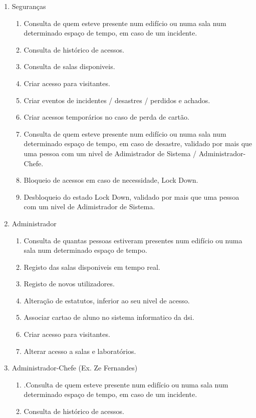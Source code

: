 \documentclass[a4paper]{report}
\begin{document}
\begin{enumerate}
\item Seguranças
	\begin{enumerate}
	\item Consulta de quem esteve presente num edifício ou numa sala num determinado espaço de tempo, em caso de um incidente.
    \item Consulta de histórico de acessos.
    \item Consulta de salas disponiveis.
    \item Criar acesso para visitantes.
    \item Criar eventos de incidentes / desastres / perdidos e achados.
    \item Criar acessos temporários no caso de perda de cartão.
    \item Consulta de quem esteve presente num edifício ou numa sala num determinado espaço de tempo, em caso de desastre, validado por mais que uma pessoa com um nivel de Adimistrador de Sistema / Administrador-Chefe.
    \item Bloqueio de acessos em caso de necessidade, Lock Down.
    \item Desbloqueio do estado Lock Down, validado por mais que uma pessoa com um nivel de Adimistrador de Sistema.
	\end{enumerate}
\item Administrador
	\begin{enumerate}
    \item Consulta de quantas pessoas estiveram presentes num edifício ou numa sala num determinado espaço de tempo.
    \item Registo das salas disponiveis em tempo real.
    \item Registo de novos utilizadores.
    \item Alteração de estatutos, inferior ao seu nivel de acesso.
    \item Associar cartao de aluno no sistema informatico da dsi.
    \item Criar acesso para visitantes.
    \item Alterar acesso a salas e laboratórios.
    \end{enumerate}
\item Administrador-Chefe (Ex. Ze Fernandes)
	\begin{enumerate}
	\item .Consulta de quem esteve presente num edifício ou numa sala num determinado espaço de tempo, em caso de um incidente.
    \item Consulta de histórico de acessos.

\end{enumerate}
\end{enumerate}
\end{document}
